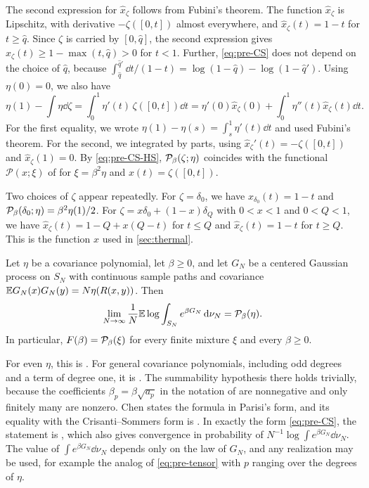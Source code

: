 The second expression for $\hat x_\zeta$ follows from Fubini's theorem. The function $\hat x_\zeta$ is Lipschitz, with derivative $-\zeta([0,t])$ almost everywhere, and $\hat x_\zeta(t)=1-t$ for $t\ge\hat q$. Since $\zeta$ is carried by $[0,\hat q]$, the second expression gives $\hat x_\zeta(t)\ge1-\max(t,\hat q)>0$ for $t<1$. Further, \eqref{eq:pre-CS} does not depend on the choice of $\hat q$, because $\int_{\hat q}^{\hat q'}\dd t/(1-t)=\log(1-\hat q)-\log(1-\hat q')$. Using $\eta(0)=0$, we also have
\begin{equation}\label{eq:pre-CS-HS}
\eta(1)-\int\eta\dd\zeta=\int_0^1\eta'(t)\,\zeta([0,t])\dd t=\eta'(0)\hat x_\zeta(0)+\int_0^1\eta''(t)\hat x_\zeta(t)\dd t.
\end{equation}
For the first equality, we wrote $\eta(1)-\eta(s)=\int_s^1\eta'(t)\dd t$ and used Fubini's theorem. For the second, we integrated by parts, using $\hat x_\zeta'(t)=-\zeta([0,t])$ and $\hat x_\zeta(1)=0$. By \eqref{eq:pre-CS-HS}, $\mathcal P_\beta(\zeta;\eta)$ coincides with the functional $\mathcal P(x;\xi)$ of \cite[(1.4)]{HuangSellke2024} for $\xi=\beta^2\eta$ and $x(t)=\zeta([0,t])$.

Two choices of $\zeta$ appear repeatedly. For $\zeta=\delta_0$, we have $\hat x_{\delta_0}(t)=1-t$ and $\mathcal P_\beta(\delta_0;\eta)=\beta^2\eta(1)/2$. For $\zeta=x\delta_0+(1-x)\delta_Q$ with $0<x<1$ and $0<Q<1$, we have $\hat x_\zeta(t)=1-Q+x(Q-t)$ for $t\le Q$ and $\hat x_\zeta(t)=1-t$ for $t\ge Q$. This is the function $\hat x$ used in \cref{sec:thermal}.

\begin{theorem}\label{thm:pre-parisi}
Let $\eta$ be a covariance polynomial, let $\beta\ge0$, and let $G_N$ be a centered Gaussian process on $S_N$ with continuous sample paths and covariance $\mathbb E G_N(x)G_N(y)=N\eta(R(x,y))$. Then
\[
\lim_{N\to\infty}\frac1N\mathbb E\log\int_{S_N}e^{\beta G_N}\,\mathrm d\nu_N=\mathcal P_\beta(\eta).
\]
In particular, $F(\beta)=\mathcal P_\beta(\xi)$ for every finite mixture $\xi$ and every $\beta\ge0$.
\end{theorem}

For even $\eta$, this is \cite[Theorem~1.1]{Talagrand2006}. For general covariance polynomials, including odd degrees and a term of degree one, it is \cite[Theorem~1]{Chen2013}. The summability hypothesis there holds trivially, because the coefficients $\beta_p=\beta\sqrt{a_p}$ in the notation of \cite[(1.2)]{Chen2013} are nonnegative and only finitely many are nonzero. Chen states the formula in Parisi's form, and its equality with the Crisanti--Sommers form is \cite[Theorem~4.1]{Talagrand2006}. In exactly the form \eqref{eq:pre-CS}, the statement is \cite[Theorem~1.1]{HuangSellke2024}, which also gives convergence in probability of $N^{-1}\log\int e^{\beta G_N}\dd\nu_N$. The value of $\int e^{\beta G_N}\dd\nu_N$ depends only on the law of $G_N$, and any realization may be used, for example the analog of \eqref{eq:pre-tensor} with $p$ ranging over the degrees of $\eta$.

